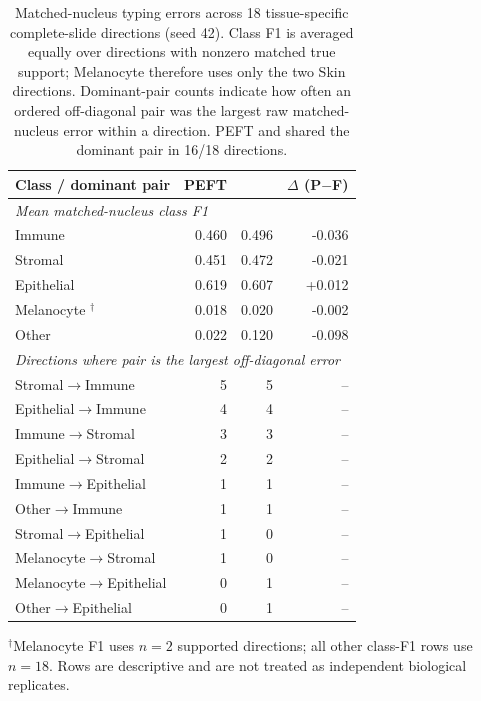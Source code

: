 \begin{table}[t]
\caption{Matched-nucleus typing errors across 18 tissue-specific \SAMH{} complete-slide directions (seed 42). Class F1 is averaged equally over directions with nonzero matched true support; Melanocyte therefore uses only the two Skin directions. Dominant-pair counts indicate how often an ordered off-diagonal pair was the largest raw matched-nucleus error within a direction. PEFT and \FullFT{} shared the dominant pair in 16/18 directions.}
\label{tab:tissue-typing-confusions}
\centering
\scriptsize
\setlength{\tabcolsep}{4pt}
\begin{tabular}{lrrr}
\toprule
Class / dominant pair & PEFT & \FullFT{} & $\Delta$ (P$-$F) \\
\midrule
\multicolumn{4}{l}{\textit{Mean matched-nucleus class F1}} \\
Immune & 0.460 & 0.496 & -0.036 \\
Stromal & 0.451 & 0.472 & -0.021 \\
Epithelial & 0.619 & 0.607 & +0.012 \\
Melanocyte $^{\dagger}$ & 0.018 & 0.020 & -0.002 \\
Other & 0.022 & 0.120 & -0.098 \\
\midrule
\multicolumn{4}{l}{\textit{Directions where pair is the largest off-diagonal error}} \\
Stromal$\rightarrow$Immune & 5 & 5 & -- \\
Epithelial$\rightarrow$Immune & 4 & 4 & -- \\
Immune$\rightarrow$Stromal & 3 & 3 & -- \\
Epithelial$\rightarrow$Stromal & 2 & 2 & -- \\
Immune$\rightarrow$Epithelial & 1 & 1 & -- \\
Other$\rightarrow$Immune & 1 & 1 & -- \\
Stromal$\rightarrow$Epithelial & 1 & 0 & -- \\
Melanocyte$\rightarrow$Stromal & 1 & 0 & -- \\
Melanocyte$\rightarrow$Epithelial & 0 & 1 & -- \\
Other$\rightarrow$Epithelial & 0 & 1 & -- \\
\bottomrule
\end{tabular}
\vspace{1pt}
\parbox{0.96\linewidth}{\scriptsize $^{\dagger}$Melanocyte F1 uses $n=2$ supported directions; all other class-F1 rows use $n=18$. Rows are descriptive and are not treated as independent biological replicates.}
\end{table}
